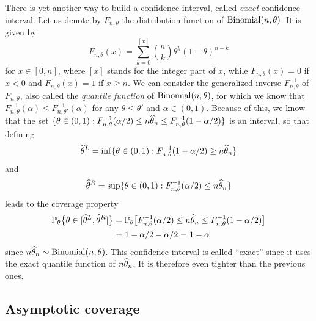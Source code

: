 There is yet another way to build a confidence interval, called \emph{exact} confidence interval.
Let us denote by $F_{n, \theta}$ the distribution function of $\operatorname{Binomial}(n, \theta)$. 
It is given by
\begin{equation}
	\label{eq:binomial_distribution}
	F_{n, \theta}(x) = \sum_{k=0}^{[x]}\binom{n}{k} \theta^k (1 - \theta)^{n - k}
\end{equation}
for $x \in [0, n]$, where $[x]$ stands for the integer part of $x$, while $F_{n, \theta}(x) = 0$ if $x < 0$ and $F_{n, \theta}(x) = 1$ if $x \geq n$.
We can consider the generalized inverse $F_{n, \theta}^{-1}$ of $F_{n, \theta}$,  also called the \emph{quantile function} of $\operatorname{Binomial}(n, \theta)$, for which we know that $F_{n, \theta}^{-1}(\alpha) \leq F_{n, \theta'}^{-1}(\alpha)$ for any $\theta \leq \theta'$ and $\alpha \in (0, 1)$.%
Because of this, we know that the set $\{ \theta \in (0, 1) : F_{n, \theta}^{-1}(\alpha / 2) \leq n \widehat \theta_n \leq F_{n, \theta}^{-1}(1 - \alpha / 2) \}$ is an interval, so that defining
\begin{equation*}
	\widehat \theta^L = \inf\{ \theta \in (0, 1) : F_{n, \theta}^{-1}(1 - \alpha / 2) \geq n \widehat \theta_n  \}
\end{equation*}
and
\begin{equation*}
	\widehat \theta^R = \sup\{ \theta \in (0, 1) : F_{n, \theta}^{-1}(\alpha / 2) \leq n \widehat \theta_n  \}
\end{equation*}
leads to the coverage property
\begin{align*}
	\mathbb P_\theta \big\{ \theta \in [\widehat \theta^L, \widehat \theta^R] \big\} 
	&= \mathbb P_\theta\big[ F_{n, \theta}^{-1}(\alpha / 2) \leq n \widehat \theta_n \leq F_{n, \theta}^{-1}(1 - \alpha / 2) \big] \\
	&= 1 - \alpha / 2 - \alpha / 2 = 1 - \alpha
\end{align*}
since $n \widehat \theta_n \sim \operatorname{Binomial}(n, \theta)$.
This confidence interval is called ``exact'' since it uses the exact quantile function of $n \widehat \theta_n$. It is therefore even tighter than the previous ones.


\subsection{Asymptotic coverage} %
\label{sub:asymptotic_coverage}


